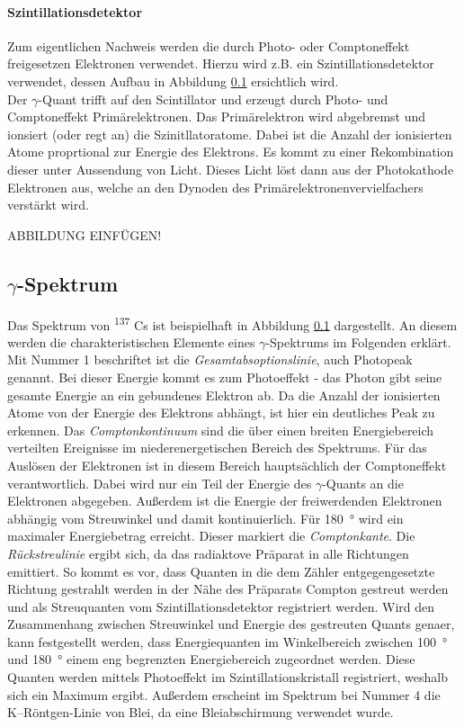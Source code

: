 \documentclass[a4paper,twoside,final]{article}
\begin{document}
\paragraph{Szintillationsdetektor}
Zum eigentlichen Nachweis werden die durch Photo- oder Comptoneffekt freigesetzen Elektronen verwendet. Hierzu wird z.B. ein Szintillationsdetektor verwendet, dessen Aufbau in Abbildung \ref{} ersichtlich wird.\\
Der $\gamma$-Quant trifft auf den Scintillator und erzeugt durch Photo- und Comptoneffekt Primärelektronen. Das Primärelektron wird abgebremst und ionsiert (oder regt an) die Szinitllatoratome. Dabei ist die Anzahl der ionisierten Atome proprtional zur Energie des Elektrons. Es kommt zu einer Rekombination dieser unter Aussendung von Licht. Dieses Licht löst dann aus der Photokathode Elektronen aus, welche an den Dynoden des Primärelektronenvervielfachers verstärkt wird.

ABBILDUNG EINFÜGEN!

\subsection{$\gamma$-Spektrum}
Das Spektrum von \textsuperscript{137} Cs ist beispielhaft in Abbildung \ref{} dargestellt. An diesem werden die charakteristischen Elemente eines $\gamma$-Spektrums im Folgenden erklärt. \\
Mit Nummer 1 beschriftet ist die \textit{Gesamtabsoptionslinie}, auch Photopeak genannt. Bei dieser Energie kommt es zum Photoeffekt - das Photon gibt seine gesamte Energie an ein gebundenes Elektron ab. Da die Anzahl der ionisierten Atome von der Energie des Elektrons abhängt, ist hier ein deutliches Peak zu erkennen. Das \textit{Comptonkontinuum} sind die über einen breiten Energiebereich verteilten Ereignisse im niederenergetischen Bereich des Spektrums. Für das Auslösen der Elektronen ist in diesem Bereich hauptsächlich der Comptoneffekt verantwortlich. Dabei wird nur ein Teil der Energie des $\gamma$-Quants an die Elektronen abgegeben. Außerdem ist die Energie der freiwerdenden Elektronen abhängig vom Streuwinkel und damit kontinuierlich. Für \SI{180}{\degree} wird ein maximaler Energiebetrag erreicht. Dieser markiert die \textit{Comptonkante}. Die \textit{Rückstreulinie} ergibt sich, da das radiaktove Präparat in alle Richtungen emittiert. So kommt es vor, dass Quanten in die dem Zähler entgegengesetzte Richtung gestrahlt werden in der Nähe des Präparats Compton gestreut werden und als Streuquanten vom Szintillationsdetektor registriert werden. Wird den Zusammenhang zwischen Streuwinkel und Energie des gestreuten Quants genaer, kann festgestellt werden, dass Energiequanten im Winkelbereich zwischen \SI{100}{\degree} und \SI{180}{\degree} einem eng begrenzten Energiebereich zugeordnet werden. Diese Quanten werden mittels Photoeffekt im Szintillationskristall registriert, weshalb sich ein Maximum ergibt. Außerdem erscheint im Spektrum bei Nummer 4 die K--Röntgen-Linie von Blei, da eine Bleiabschirmung verwendet wurde.
\end{document}
